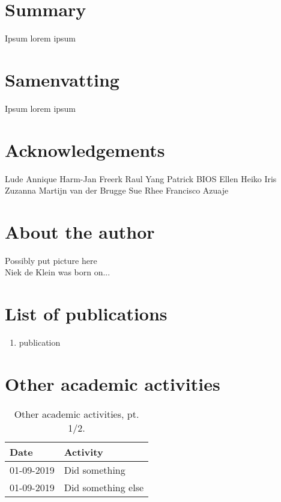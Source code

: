 \begin{appendices}

\chapter{Summary}
Ipsum lorem ipsum

\chapter{Samenvatting}
Ipsum lorem ipsum

\chapter{Acknowledgements}

\newpage
Lude
Annique
Harm-Jan
Freerk
Raul
Yang
Patrick
BIOS
Ellen
Heiko
Iris
Zuzanna
Martijn van der Brugge
Sue Rhee
Francisco Azuaje


\chapter{About the author}

Possibly put picture here \\
Niek de Klein was born on...

\chapter{List of publications}

\begin{enumerate}
\item publication
\end{enumerate}

\chapter{Other academic activities}

\begin{table}
\footnotesize
\begin{tabulary}{\linewidth}{LL}
  Date & Activity \\
  \hline
  \rule{0pt}{2.5ex}\mbox{01-09-2019} & Did something \\
  \rule{0pt}{2.5ex}\mbox{01-09-2019} & Did something else \\
  \hline
\end{tabulary}
\caption[Other academic activities, pt. 1/2]{Other academic activities, pt. 1/2.}
\label{table:appendix_activities_1}
\end{table}


\end{appendices}
